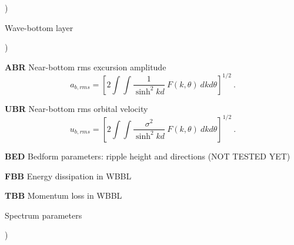 \begin{list}{)\hfill}
\item{Wave-bottom layer}

\begin{list}{)\hfill}
            { \leftmargin 8mm 
             \rightmargin 0mm \itemsep 0mm \parsep 0mm}

\item \textbf{ABR} Near-bottom rms excursion amplitude
      \begin{equation} a_{b,rms} = \left [ 2 \int \!\!\!\! \int
      \frac{1}{\sinh^2 kd} \: F(k,\theta) \: dk d\theta \right ] ^{1/2}
      \: . \label{eq:ab_rms} \end{equation}
\item \textbf{UBR} Near-bottom rms orbital velocity
      \begin{equation} u_{b,rms} = \left [ 2 \int \!\!\!\! \int
      \frac{\sigma^2}{\sinh^2 kd} \: F(k,\theta) \: dk d\theta \right ] ^{1/2}
      \: . \label{eq:ub_rms} \end{equation}
\item \textbf{BED} Bedform parameters: ripple height and directions (NOT TESTED YET)   
\item \textbf{FBB} Energy dissipation in WBBL 
\item \textbf{TBB} Momentum loss in WBBL 
\end{list}

\item{Spectrum parameters}

\begin{list}{)\hfill}
            { \leftmargin 8mm 
             \rightmargin 0mm \itemsep 0mm \parsep 0mm}


\end{list}
\end{list}
